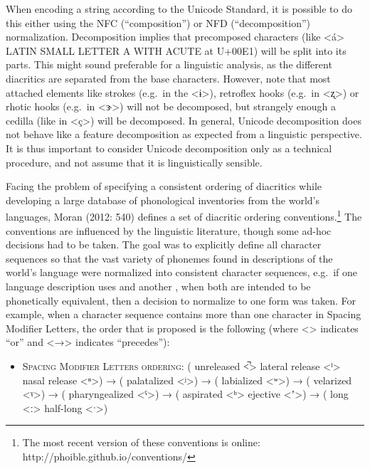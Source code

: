 When encoding a string according to the Unicode Standard, it is possible to do this either using the NFC (``composition'') or NFD (``decomposition'') normalization. Decomposition implies that precomposed characters (like <á> LATIN SMALL LETTER A WITH ACUTE at U+00E1) will be split into its parts. This might sound preferable for a linguistic analysis, as the different diacritics are separated from the base characters. However, note that most attached elements like strokes (e.g.~in the <ɨ>), retroflex hooks (e.g.~in <ʐ>) or rhotic hooks (e.g.~in <ɝ>) will not be decomposed, but strangely enough a cedilla (like in <ç>) will be decomposed. In general, Unicode decomposition does not behave like a feature decomposition as expected from a linguistic perspective. It is thus important to consider Unicode decomposition only as a technical procedure, and not assume that it is linguistically sensible.

Facing the problem of specifying a consistent ordering of diacritics while developing a large database of phonological inventories from the world's languages, Moran (2012: 540) defines a set of diacritic ordering conventions.\footnote{The most recent version of these conventions is online: http://phoible.github.io/conventions/} The conventions are influenced by the linguistic literature, though some ad-hoc decisions had to be taken. The goal was to explicitly define all character sequences so that the vast variety of phonemes found in descriptions of the world's language were normalized into consistent character sequences, e.g.~if one language description uses and another , when both are intended to be phonetically equivalent, then a decision to normalize to one form was taken. For example, when a character sequence contains more than one character in Spacing Modifier Letters, the order that is proposed is the following (where <\textbar{}> indicates ``or'' and <→> indicates ``precedes''):
\begin{itemize}
	\itemsep1pt\parskip0pt 
	\item \textsc{Spacing Modifier Letters ordering:} ( unreleased <̚> \textbar{} lateral release <ˡ> \textbar{} nasal release <ⁿ>) → ( palatalized <ʲ>) → ( labialized <ʷ>) → ( velarized <ˠ>) → ( pharyngealized <ˤ>) → ( aspirated <ʰ> \textbar{} ejective <ʼ>) → ( long <ː> \textbar{} half-long <ˑ>) 
\end{itemize}

